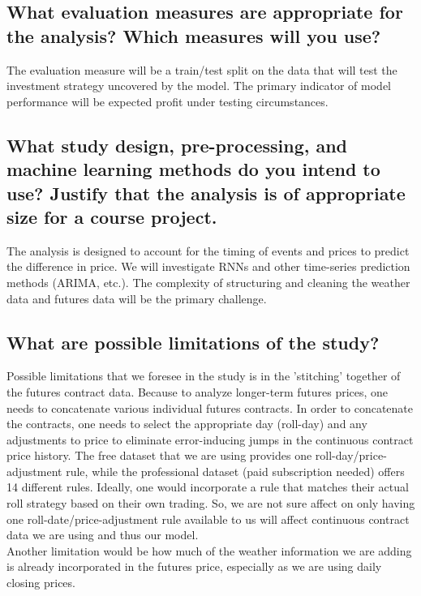 \documentclass[twoside,11pt]{article}
\begin{document}
\subsection{What evaluation measures are appropriate for the analysis? Which measures will you use?}

The evaluation measure will be a train/test split on the data that will test the investment strategy uncovered by the model. The primary indicator of model performance will be expected profit under testing circumstances.

\subsection{What study design, pre-processing, and machine learning methods do you intend to use? Justify that the analysis is of appropriate size for a course project.}

The analysis is designed to account for the timing of events and prices to predict the difference in price. We will investigate RNNs and other time-series prediction methods (ARIMA, etc.). The complexity of structuring and cleaning the weather data and futures data will be the primary challenge.

\subsection{What are possible limitations of the study?}

Possible limitations that we foresee in the study is in the 'stitching' together of the futures contract data.  Because to analyze longer-term futures prices, one needs to concatenate various individual futures contracts.  In order to concatenate the contracts, one needs to select the appropriate day (roll-day) and any adjustments to price to eliminate error-inducing jumps in the continuous contract price history.  The free dataset that we are using provides one roll-day/price-adjustment rule, while the professional dataset (paid subscription needed) offers 14 different rules.  Ideally, one would incorporate a rule that matches their actual roll strategy based on their own trading.  So, we are not sure affect on only having one roll-date/price-adjustment rule available to us will affect continuous contract data we are using and thus our model.\\
\indent Another limitation would be how much of the weather information we are adding is already incorporated in the futures price, especially as we are using daily closing prices.





\end{document}
